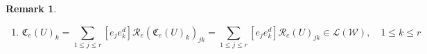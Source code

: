 \documentclass[aps,preprint]{revtex4}%
\newtheorem{remark}[theorem]{Remark}
\begin{document}
\begin{remark}
\begin{enumerate}
\begin{align}
\right)  \left(
\begin{array}
[c]{c}%
e_{1}^{d}\\
\vdots\\
e_{r}^{d}%
\end{array}
\right) \\
&  =\left(
\begin{array}
[c]{ccc}%
e_{1} & \cdots & e_{r}%
\end{array}
\right)  \left(
\begin{array}
[c]{ccc}%
e_{1}^{d}\left(  a_{1}\right)  & \cdots & e_{1}^{d}\left(  a_{r}\right) \\
\vdots & \ddots & \vdots\\
e_{r}^{d}\left(  a_{1}\right)  & \cdots & e_{r}^{d}\left(  a_{r}\right)
\end{array}
\right)  \left(
\begin{array}
[c]{ccc}%
z_{1} & \cdots & 0\\
\vdots & \ddots & \vdots\\
0 & \cdots & z_{r}%
\end{array}
\right)  \left(
\begin{array}
[c]{ccc}%
a_{1}^{d}\left(  e_{1}\right)  & \cdots & a_{1}^{d}\left(  e_{r}\right) \\
\vdots & \ddots & \vdots\\
a_{r}^{d}\left(  e_{1}\right)  & \cdots & a_{r}^{d}\left(  e_{r}\right)
\end{array}
\right)  \left(
\begin{array}
[c]{c}%
e_{1}^{d}\\
\vdots\\
e_{r}^{d}%
\end{array}
\right) \\
&  =\left(
\begin{array}
[c]{ccc}%
e_{1} & \cdots & e_{r}%
\end{array}
\right)  \sum_{1\leq k\leq r}\mathfrak{C}_{a}\left(  \left[  \mathbf{ae}%
^{dt}\right]  \right)  _{k}z_{k}\sum_{1\leq l\leq r}\mathfrak{C}_{a}\left(
\left[  \mathbf{ea}^{dt}\right]  \right)  _{l}\left(
\begin{array}
[c]{c}%
e_{1}^{d}\\
\vdots\\
e_{r}^{d}%
\end{array}
\right)  =\mathcal{R}_{e}\left(  \sum_{1\leq k,l\leq r}\left[  a_{k}e_{k}%
^{d}\right]  z_{k}\left[  e_{l}a_{l}^{d}\right]  \right)  .
\end{align}


\item
\begin{equation}
\mathfrak{C}_{e}\left(  U\right)  _{k}=\sum_{1\leq j\leq r}\left[  e_{j}%
e_{k}^{d}\right]  \mathcal{R}_{e}\left(  \mathfrak{C}_{e}\left(  U\right)
_{k}\right)  _{jk}=\sum_{1\leq j\leq r}\left[  e_{j}e_{k}^{d}\right]
\mathcal{R}_{e}\left(  U\right)  _{jk}\in\mathcal{L}\left(  \mathcal{W}%
\right)  ,\quad1\leq k\leq r
\end{equation}



\end{enumerate}
\end{remark}
\end{document}
